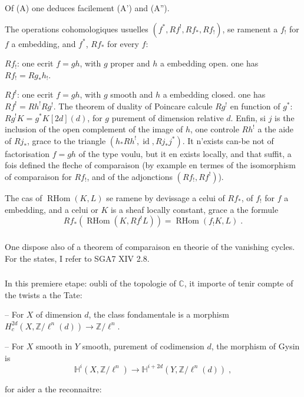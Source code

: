 \documentclass[12pt,a4paper]{article}
\theoremstyle{plain}
\theoremstyle{definition}
\theoremstyle{remark}
\DeclareMathOperator{\id}{id}
\DeclareMathOperator{\RHom}{RHom}
\newcommand{\CC}{\mathbb{C}}
\newcommand{\HH}{\mathbb{H}}
\newcommand{\ZZ}{\mathbb{Z}}
\begin{document}
Of (A) one deduces facilement (A') and (A'').

The operations cohomologiques usuelles $(f^*, Rf^!, Rf_*, Rf_!)$, se ramenent a $f_!$ for $f$ a embedding, and $f^*$, $Rf_*$ for every $f$:

$Rf_!$: one ecrit $f = gh$, with $g$ proper and $h$ a embedding open. one has $Rf_! = Rg_*h_!$.

$Rf^!$: one ecrit $f = gh$, with $g$ smooth and $h$ a embedding closed. one has $Rf^! = Rh^!Rg^!$. The theorem of duality of Poincare calcule $Rg^!$ en function of $g^*$: $Rg^!K = g^*K[2d](d)$, for $g$ purement of dimension relative $d$. Enfin, si $j$ is the inclusion of the open complement of the image of $h$, one controle $Rh^!$ a the aide of $Rj_*$, grace to the triangle $(h_*Rh^!, \id, Rj_*j^*)$. It n'exists can-be not of factorisation $f = gh$ of the type voulu, but it en exists locally, and that suffit, a fois defined the fleche of comparaison (by example en termes of the isomorphism of comparaison for $Rf_!$, and of the adjonctions $(Rf_!, Rf^!)$).

The cas of $\RHom(K, L)$ se ramene by devissage a celui of $Rf_*$, of $f_!$ for $f$ a embedding, and a celui or $K$ is a sheaf locally constant, grace a the formule
\[
Rf_*(\RHom(K, Rf^!L)) = \RHom(f_!K, L)\;.
\]

\subsubsection{}
One dispose also of a theorem of comparaison en theorie of the vanishing cycles. For the states, I refer to SGA7 XIV 2.8.

\subsubsection{}
In this premiere etape: oubli of the topologie of $\CC$, it importe of tenir compte of the twists a the Tate:

-- For $X$ of dimension $d$, the class fondamentale is a morphism $H^{2d}_c(X, \ZZ/\ell^n(d)) \longrightarrow \ZZ/\ell^n$.

-- For $X$ smooth in $Y$ smooth, purement of codimension $d$, the morphism of Gysin is
\[
\HH^i(X, \ZZ/\ell^n) \longrightarrow \HH^{i+2d}(Y, \ZZ/\ell^n(d))\;,
\]

for aider a the reconnaitre:
\end{document}
